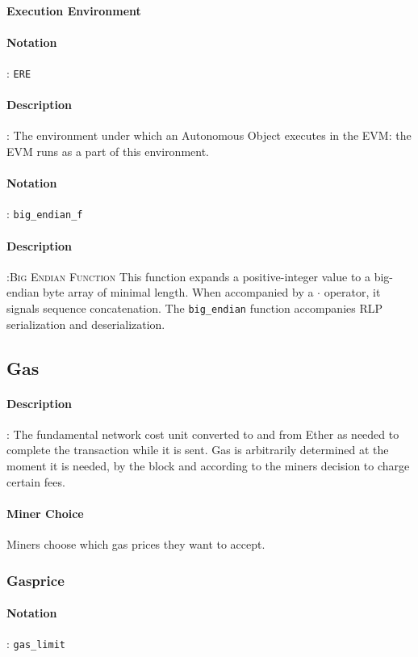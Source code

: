 \documentclass[10pt,a4paper,leqno,bibliography=totoc]{scrartcl}
\newenvironment{alphafootnotes}
{\par\edef\savedfootnotenumber{\number\value{footnote}}
\renewcommand{\thefootnote}{\alph{footnote}}
\setcounter{footnote}{0}}
{\par\setcounter{footnote}{\savedfootnotenumber}}
\begin{document}
\begin{alphafootnotes}
\begin{multicols*}{2}
				\paragraph{Execution Environment}
					\paragraph{Notation}: \texttt{ERE}
					\paragraph{Description}: The environment under which an Autonomous Object executes in the EVM: the EVM runs as a part of this environment.  

				\paragraph{Notation}: \texttt{big\_endian\_f}
				\paragraph{Description}:\textsc{Big Endian Function} This function expands a positive-integer value to a big-endian byte array of minimal length. When accompanied by a $\cdot$ operator, it signals sequence concatenation. The \texttt{big\_endian} function  accompanies RLP serialization and deserialization.

			\subsection{Gas}
				\paragraph{Description}: The fundamental network cost unit converted to and from Ether as needed to complete the transaction while it is sent. Gas is arbitrarily determined at the moment it is needed, by the block and according to the miners decision to charge certain fees. 
				\paragraph{Miner Choice}
					Miners choose which gas prices they want to accept.
	
				\subsubsection{Gasprice}
					\paragraph{Notation}: \texttt{gas\_limit}

\end{multicols*}
\end{alphafootnotes}
\end{document}
